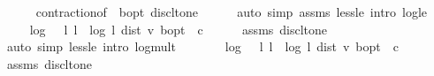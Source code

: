 \begin{isabellebody}
\ \ \ \ \isamarkupfalse%
\ contraction{\isacharunderscore}{\kern0pt}{\isasymL}{\isacharbrackleft}{\kern0pt}of\ {\isacharunderscore}{\kern0pt}\ {\isachardoublequoteopen}{\isasymnu}\isactrlsub b{\isacharunderscore}{\kern0pt}opt{\isachardoublequoteclose}{\isacharbrackright}{\kern0pt}\ disc{\isacharunderscore}{\kern0pt}lt{\isacharunderscore}{\kern0pt}one\isanewline
\ \ \ \ \isamarkupfalse%
\ {\isacharparenleft}{\kern0pt}auto\ simp{\isacharcolon}{\kern0pt}\ assms\ less{\isacharunderscore}{\kern0pt}le\ intro{\isacharcolon}{\kern0pt}\ log{\isacharunderscore}{\kern0pt}le{\isacharparenright}{\kern0pt}\isanewline
\ \ \isamarkupfalse%
\ \isamarkupfalse%
\ {\isachardoublequoteopen}{\isasymdots}\ {\isacharequal}{\kern0pt}\ log\ {\isacharparenleft}{\kern0pt}{}\ {\isacharslash}{\kern0pt}\ l{\isacharparenright}{\kern0pt}\ l\ {\isacharplus}{\kern0pt}\ log\ {\isacharparenleft}{\kern0pt}{}{\isacharslash}{\kern0pt}l{\isacharparenright}{\kern0pt}\ {\isacharparenleft}{\kern0pt}dist\ v\ {\isasymnu}\isactrlsub b{\isacharunderscore}{\kern0pt}opt{\isacharparenright}{\kern0pt}\ {\isacharminus}{\kern0pt}\ c{\isachardoublequoteclose}\isanewline
\ \ \ \ \isamarkupfalse%
\ assms\ disc{\isacharunderscore}{\kern0pt}lt{\isacharunderscore}{\kern0pt}one\ \isanewline
\ \ \ \ \isamarkupfalse%
\ {\isacharparenleft}{\kern0pt}auto\ simp{\isacharcolon}{\kern0pt}\ less{\isacharunderscore}{\kern0pt}le\ intro{\isacharbang}{\kern0pt}{\isacharcolon}{\kern0pt}\ log{\isacharunderscore}{\kern0pt}mult{\isacharparenright}{\kern0pt}\isanewline
\ \ \isamarkupfalse%
\ \isamarkupfalse%
\ {\isachardoublequoteopen}{\isasymdots}\ {\isacharequal}{\kern0pt}\ {\isacharminus}{\kern0pt}{\isacharparenleft}{\kern0pt}log\ {\isacharparenleft}{\kern0pt}{}\ {\isacharslash}{\kern0pt}\ l{\isacharparenright}{\kern0pt}\ {\isacharparenleft}{\kern0pt}{}{\isacharslash}{\kern0pt}l{\isacharparenright}{\kern0pt}{\isacharparenright}{\kern0pt}\ {\isacharplus}{\kern0pt}\ {\isacharparenleft}{\kern0pt}log\ {\isacharparenleft}{\kern0pt}{}{\isacharslash}{\kern0pt}l{\isacharparenright}{\kern0pt}\ {\isacharparenleft}{\kern0pt}dist\ v\ {\isasymnu}\isactrlsub b{\isacharunderscore}{\kern0pt}opt{\isacharparenright}{\kern0pt}{\isacharparenright}{\kern0pt}\ {\isacharminus}{\kern0pt}\ c{\isachardoublequoteclose}\isanewline
\ \ \ \ \isamarkupfalse%
\ assms\ disc{\isacharunderscore}{\kern0pt}lt{\isacharunderscore}{\kern0pt}one\isanewline
\ \ \ \ \isamarkupfalse%

\end{isabellebody}
